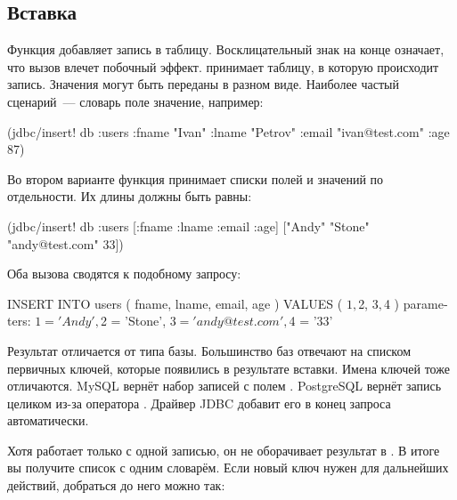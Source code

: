 \subsection{Вставка}


Функция  добавляет запись в таблицу. Восклицательный знак на конце означает, что вызов влечет побочный эффект.  принимает таблицу, в которую происходит запись. Значения могут быть переданы в разном виде. Наиболее частый сценарий~--- словарь поле \arr значение, например:

\begin{english}
  \begin{clojure}
(jdbc/insert! db :users
              {:fname "Ivan"
               :lname "Petrov"
               :email "ivan@test.com"
               :age 87})
  \end{clojure}
\end{english}

Во втором варианте функция принимает списки полей и значений по отдельности. Их длины должны быть равны:

\begin{english}
  \begin{clojure}
(jdbc/insert! db :users
              [:fname :lname :email :age]
              ["Andy" "Stone" "andy@test.com" 33])
  \end{clojure}
\end{english}

Оба вызова сводятся к подобному запросу:

\begin{english}
  \begin{sql}
INSERT INTO users ( fname, lname, email, age )
VALUES ( $1, $2, $3, $4 )
parameters:
  $1 = 'Andy', $2 = 'Stone',
  $3 = 'andy@test.com', $4 = '33'
  \end{sql}
\end{english}

Результат  отличается от типа базы. Большинство баз отвечают на  списком первичных ключей, которые появились в результате вставки. Имена ключей тоже отличаются. MySQL вернёт набор записей с полем . PostgreSQL вернёт запись целиком из-за оператора . Драйвер JDBC добавит его в конец запроса автоматически.


Хотя  работает только с одной записью, он не оборачивает результат в . В итоге вы получите список с одним словарём. Если новый ключ нужен для дальнейших действий, добраться до него можно так:

